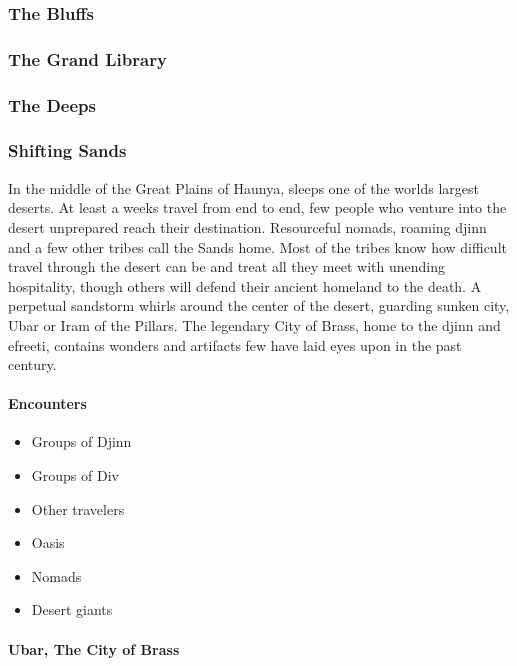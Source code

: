		\subsubsection{The Bluffs}
		
		\subsubsection{The Grand Library}

		\subsubsection{The Deeps}

		\subsubsection{Shifting Sands}
		
		In the middle of the Great Plains of Haunya, sleeps one of the
		worlds largest deserts. At least a weeks travel from end to end,
		few people who venture into the desert unprepared reach their 
		destination.  Resourceful nomads, roaming djinn and a few other
		tribes call the Sands home.  Most of the tribes know how difficult
		travel through the desert can be and treat all they meet with 
		unending hospitality, though others will defend their ancient 
		homeland to the death.  A perpetual sandstorm whirls around the
		center of the desert, guarding sunken city, Ubar or Iram of the 
		Pillars.  The legendary City of Brass, home to the djinn and
		efreeti, contains wonders and artifacts few have laid eyes upon
		in the past century.  

		\paragraph{Encounters}
			\begin{itemize}
				\item Groups of Djinn
				\item Groups of Div
				\item Other travelers
				\item Oasis 
				\item Nomads
				\item Desert giants
			\end{itemize}
		
		\paragraph{Ubar, The City of Brass}
